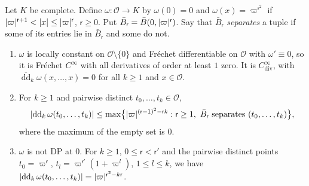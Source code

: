 \begin{example}\label{dp:ex:zero-jets}
Let $K$ be complete. Define $\omega\colon\mathcal O\to K$ by $\omega(0)=0$ and $\omega(x)=\varpi^{\mathsf r^2}$ if $\lvert \varpi\rvert^{\mathsf r+1}<\lvert x\rvert\le\lvert \varpi\rvert^{\mathsf r}$, $\mathsf r\ge0$. Put $\bar B_{\mathsf r}=\bar B(0,\lvert \varpi\rvert^{\mathsf r})$. Say that $\bar B_{\mathsf r}$ \emph{separates} a tuple if some of its entries lie in $\bar B_{\mathsf r}$ and some do not.
\begin{enumerate}
\item $\omega$ is locally constant on $\mathcal O\setminus\{0\}$ and Fr\'echet differentiable on $\mathcal O$ with $\omega'\equiv0$, so it is Fr\'echet $C^\infty$ with all derivatives of order at least $1$ zero. It is $C^\infty_{\mathrm{div}}$, with $\overline{\operatorname{dd}}_k\omega(x,\dots,x)=0$ for all $k\ge1$ and $x\in\mathcal O$.
\item For $k\ge1$ and pairwise distinct $t_0,\dots,t_k\in\mathcal O$,
\begin{equation}\label{dp:sq:omega-bound}
 \lvert \operatorname{dd}_k\omega(t_0,\dots,t_k)\rvert\le\max\bigl\{\lvert \varpi\rvert^{(\mathsf r-1)^2-\mathsf rk}:\mathsf r\ge1,\ \bar B_{\mathsf r}\text{ separates }(t_0,\dots,t_k)\bigr\},
\end{equation}
where the maximum of the empty set is $0$.
\item $\omega$ is not DP at $0$. For $k\ge1$, $0\le\mathsf r<\mathsf r'$ and the pairwise distinct points $t_0=\varpi^{\mathsf r}$, $t_l=\varpi^{\mathsf r'}(1+\varpi^l)$, $1\le l\le k$, we have $\lvert \operatorname{dd}_k\omega(t_0,\dots,t_k)\rvert=\lvert \varpi\rvert^{\mathsf r^2-k\mathsf r}$.
\end{enumerate}
\end{example}

